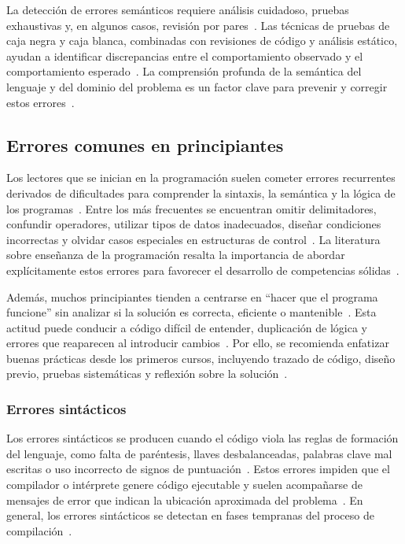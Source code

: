 \documentclass[12pt,twoside]{book}
\begin{document}
						La detección de errores semánticos requiere análisis cuidadoso, pruebas exhaustivas y, en algunos casos, revisión por pares~\cite{Stallings2021Computer}. Las técnicas de pruebas de caja negra y caja blanca, combinadas con revisiones de código y análisis estático, ayudan a identificar discrepancias entre el comportamiento observado y el comportamiento esperado~\cite{Pressman2019Software}. La comprensión profunda de la semántica del lenguaje y del dominio del problema es un factor clave para prevenir y corregir estos errores~\cite{Sommerville2015Software}.
				
				\subsection{Errores comunes en principiantes}
					Los lectores que se inician en la programación suelen cometer errores recurrentes derivados de dificultades para comprender la sintaxis, la semántica y la lógica de los programas~\cite{Gaddis2022Starting}. Entre los más frecuentes se encuentran omitir delimitadores, confundir operadores, utilizar tipos de datos inadecuados, diseñar condiciones incorrectas y olvidar casos especiales en estructuras de control~\cite{Sommerville2015Software}. La literatura sobre enseñanza de la programación resalta la importancia de abordar explícitamente estos errores para favorecer el desarrollo de competencias sólidas~\cite{Pressman2019Software}.
					
					Además, muchos principiantes tienden a centrarse en ``hacer que el programa funcione'' sin analizar si la solución es correcta, eficiente o mantenible~\cite{Gaddis2022Starting}. Esta actitud puede conducir a código difícil de entender, duplicación de lógica y errores que reaparecen al introducir cambios~\cite{Sommerville2015Software}. Por ello, se recomienda enfatizar buenas prácticas desde los primeros cursos, incluyendo trazado de código, diseño previo, pruebas sistemáticas y reflexión sobre la solución~\cite{Pressman2019Software}.
				
					\subsubsection{Errores sintácticos}
						Los errores sintácticos se producen cuando el código viola las reglas de formación del lenguaje, como falta de paréntesis, llaves desbalanceadas, palabras clave mal escritas o uso incorrecto de signos de puntuación~\cite{Gaddis2022Starting}. Estos errores impiden que el compilador o intérprete genere código ejecutable y suelen acompañarse de mensajes de error que indican la ubicación aproximada del problema~\cite{Stallings2021Computer}. En general, los errores sintácticos se detectan en fases tempranas del proceso de compilación~\cite{Tanenbaum2021Structured}.
						
\end{document}
